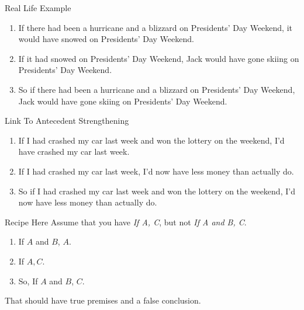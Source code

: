 \documentclass[
  ignorenonframetext,
]{beamer}
\providecommand{\tightlist}{%
  \setlength{\itemsep}{0pt}\setlength{\parskip}{0pt}}
\renewcommand{\,}{\text{, }}
\begin{document}
\begin{frame}{Real Life Example}
\protect\hypertarget{real-life-example}{}
\begin{enumerate}
\tightlist
\item
  If there had been a hurricane and a blizzard on Presidents' Day
  Weekend, it would have snowed on Presidents' Day Weekend. \pause 
\item
  If it had snowed on Presidents' Day Weekend, Jack would have gone
  skiing on Presidents' Day Weekend. \pause 
\item
  So if there had been a hurricane and a blizzard on Presidents' Day
  Weekend, Jack would have gone skiing on Presidents' Day Weekend.
\end{enumerate}
\end{frame}

\begin{frame}{Link To Antecedent Strengthening}
\protect\hypertarget{link-to-antecedent-strengthening}{}
\begin{enumerate}
\tightlist
\item
  If I had crashed my car last week and won the lottery on the weekend,
  I'd have crashed my car last week. \pause 
\item
  If I had crashed my car last week, I'd now have less money than
  actually do. \pause 
\item
  So if I had crashed my car last week and won the lottery on the
  weekend, I'd now have less money than actually do.
\end{enumerate}
\end{frame}

\begin{frame}{Recipe Here}
\protect\hypertarget{recipe-here}{}
Assume that you have \emph{If A, C}, but not \emph{If A and B, C}.

\begin{enumerate}
\tightlist
\item
  If \(A\) and \(B\), \(A\).
\item
  If \(A, C\).
\item
  So, If \(A\) and \(B\), \(C\).
\end{enumerate}

That should have true premises and a false conclusion.
\end{frame}
\end{document}
